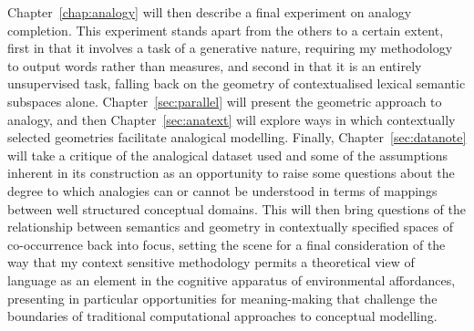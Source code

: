 Chapter~\ref{chap:analogy} will then describe a final experiment on analogy completion.  This experiment stands apart from the others to a certain extent, first in that it involves a task of a generative nature, requiring my methodology to output words rather than measures, and second in that it is an entirely unsupervised task, falling back on the geometry of contextualised lexical semantic subspaces alone.  Chapter~\ref{sec:parallel} will present the geometric approach to analogy, and then Chapter~\ref{sec:anatext} will explore ways in which contextually selected geometries facilitate analogical modelling.  Finally, Chapter~\ref{sec:datanote} will take a critique of the analogical dataset used and some of the assumptions inherent in its construction as an opportunity to raise some questions about the degree to which analogies can or cannot be understood in terms of mappings between well structured conceptual domains.  This will then bring questions of the relationship between semantics and geometry in contextually specified spaces of co-occurrence back into focus, setting the scene for a final consideration of the way that my context sensitive methodology permits a theoretical view of language as an element in the cognitive apparatus of environmental affordances, presenting in particular opportunities for meaning-making that challenge the boundaries of traditional computational approaches to conceptual modelling.

